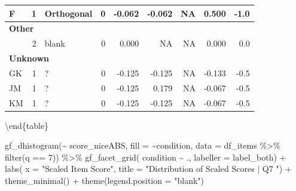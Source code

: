 \documentclass[
  letterpaper,
  DIV=11,
  numbers=noendperiod]{scrreprt}
\newenvironment{Shaded}{\begin{snugshade}}{\end{snugshade}}
\newcommand{\AttributeTok}[1]{\textcolor[rgb]{0.40,0.45,0.13}{#1}}
\newcommand{\DecValTok}[1]{\textcolor[rgb]{0.68,0.00,0.00}{#1}}
\newcommand{\FunctionTok}[1]{\textcolor[rgb]{0.28,0.35,0.67}{#1}}
\newcommand{\NormalTok}[1]{\textcolor[rgb]{0.00,0.23,0.31}{#1}}
\newcommand{\SpecialCharTok}[1]{\textcolor[rgb]{0.37,0.37,0.37}{#1}}
\newcommand{\StringTok}[1]{\textcolor[rgb]{0.13,0.47,0.30}{#1}}
\begin{document}
\begin{tabular}[t]{l|r|l|r|r|r|r|r|r}
\hline
\hspace{1em}F & 1 & Orthogonal & 0 & -0.062 & -0.062 & NA & 0.500 & -1.0\\
\hline
\multicolumn{9}{l}{\textbf{Other}}\\
\hline
\hspace{1em} & 2 & blank & 0 & 0.000 & NA & NA & 0.000 & 0.0\\
\hline
\multicolumn{9}{l}{\textbf{Unknown}}\\
\hline
\hspace{1em}GK & 1 & ? & 0 & -0.125 & -0.125 & NA & -0.133 & -0.5\\
\hline
\hspace{1em}JM & 1 & ? & 0 & -0.125 & 0.179 & NA & -0.067 & -0.5\\
\hline
\hspace{1em}KM & 1 & ? & 0 & -0.125 & -0.125 & NA & -0.067 & -0.5\\
\hline
\end{tabular}

\textbackslash end\{table\}

\begin{Shaded}
\begin{Highlighting}[]
\FunctionTok{gf\_dhistogram}\NormalTok{(}\SpecialCharTok{\textasciitilde{}}\NormalTok{ score\_niceABS, }\AttributeTok{fill =} \SpecialCharTok{\textasciitilde{}}\NormalTok{condition, }\AttributeTok{data =}\NormalTok{ df\_items }\SpecialCharTok{\%\textgreater{}\%} \FunctionTok{filter}\NormalTok{(q }\SpecialCharTok{==} \DecValTok{7}\NormalTok{)) }\SpecialCharTok{\%\textgreater{}\%} 
  \FunctionTok{gf\_facet\_grid}\NormalTok{( condition }\SpecialCharTok{\textasciitilde{}}\NormalTok{ ., }\AttributeTok{labeller =}\NormalTok{ label\_both) }\SpecialCharTok{+} 
  \FunctionTok{labs}\NormalTok{( }\AttributeTok{x =} \StringTok{"Scaled Item Score"}\NormalTok{, }\AttributeTok{title =} \StringTok{"Distribution of Scaled Scores | Q7 "}\NormalTok{) }\SpecialCharTok{+} 
  \FunctionTok{theme\_minimal}\NormalTok{() }\SpecialCharTok{+} \FunctionTok{theme}\NormalTok{(}\AttributeTok{legend.position =} \StringTok{"blank"}\NormalTok{)}
\end{Highlighting}
\end{Shaded}
\end{document}
